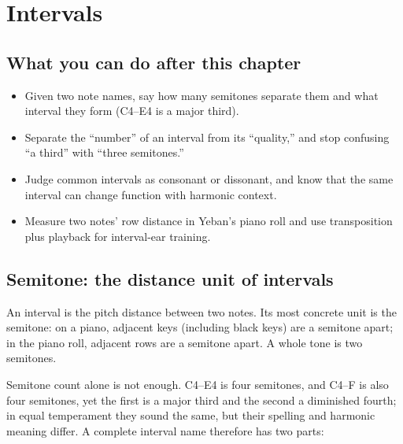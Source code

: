 \chapter{Intervals}


\label{sec:intervals}

\section*{What you can do after this chapter}
\begin{itemize}
  \item Given two note names, say how many semitones separate them and what interval they form (C4--E4 is a major third).
  \item Separate the ``number'' of an interval from its ``quality,'' and stop confusing ``a third'' with ``three semitones.''
  \item Judge common intervals as consonant or dissonant, and know that the same interval can change function with harmonic context.
  \item Measure two notes' row distance in Yeban's piano roll and use transposition plus playback for interval-ear training.
\end{itemize}

\section{Semitone: the distance unit of intervals}

An interval is the pitch distance between two notes. Its most concrete unit is the semitone: on a piano, adjacent keys (including black keys) are a semitone apart; in the piano roll, adjacent rows are a semitone apart. A whole tone is two semitones.

Semitone count alone is not enough. C4--E4 is four semitones, and C4--F is also four semitones, yet the first is a major third and the second a diminished fourth; in equal temperament they sound the same, but their spelling and harmonic meaning differ. A complete interval name therefore has two parts:

